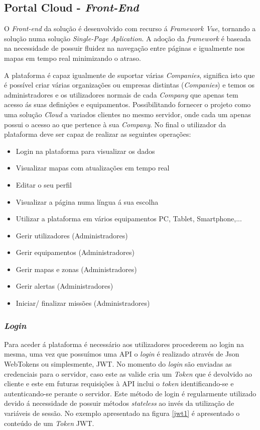 \subsection {Portal Cloud - \textit{Front-End}}

\par O \textit{Front-end} da solução é desenvolvido com recurso á \textit{Framework Vue}, tornando a solução numa solução \textit{Single-Page Aplication}. A adoção da \textit{framework} é baseada na necessidade de possuir fluidez na navegação entre páginas e igualmente nos mapas em tempo real minimizando o atraso.
\par A plataforma é capaz igualmente de suportar várias \textit{Companies}, significa isto que é possível criar várias organizações ou empresas distintas (\textit{Companies}) e temos os administradores e os utilizadores normais de cada \textit{Company} que apenas tem acesso ás suas definições e equipamentos. Possibilitando fornecer o projeto como uma solução \textit{Cloud} a variados clientes no mesmo servidor, onde cada um apenas possui o acesso ao que pertence à sua \textit{Company}.
No final o utilizador da plataforma deve ser capaz de realizar as seguintes operações:
\par
\begin{itemize}
\item Login na plataforma para visualizar os dados
\item Visualizar mapas com atualizações em tempo real
\item Editar o seu perfil
\item Visualizar a página numa língua á sua escolha
\item Utilizar a plataforma em vários equipamentos PC, Tablet, Smartphone,...
\item Gerir utilizadores (Administradores)
\item Gerir equipamentos (Administradores)
\item Gerir mapas e zonas (Administradores)
\item Gerir alertas (Administradores)
\item Iniciar/ finalizar missões (Administradores)
\end{itemize}


\subsubsection{\textit{Login}}
\par Para aceder á plataforma é necessário aos utilizadores procederem ao login na mesma, uma vez que possuímos uma API o \textit{login} é realizado através de Json WebTokens ou simplesmente, JWT. No momento do \textit{login} são enviadas as credenciais para o servidor, caso este as valide cria um \textit{Token} que é devolvido ao cliente e este em futuras requisições à API inclui o \textit{token} identificando-se e autenticando-se perante o servidor. Este método de login é regularmente utilizado devido á necessidade de possuir métodos \textit{stateless} ao invés da utilização de variáveis de sessão. No exemplo apresentado na figura \ref{jwt1} é apresentado o conteúdo de um \textit{Token} JWT. 


